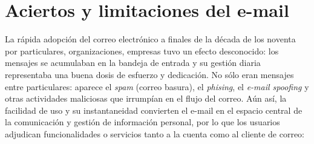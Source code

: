 \documentclass[12pt, a4paper,twoside]{book}
\begin{document}
\section{Aciertos y limitaciones del e-mail}

La rápida adopción del correo electrónico a finales de la década de
los noventa por particulares, organizaciones, empresas tuvo un
efecto desconocido: los mensajes se acumulaban en la bandeja de
entrada y su gestión diaria representaba una buena dosis de
esfuerzo y dedicación. No sólo eran mensajes entre particulares:
aparece el \emph{spam} (correo basura), el \emph{phising}, el
\emph{e-mail spoofing} y otras actividades maliciosas que irrumpían
en el flujo del correo. Aún así, la facilidad de uso y su
instantaneidad convierten el e-mail en el espacio central de la
comunicación y gestión de información personal, por lo que los
usuarios adjudican funcionalidades o servicios tanto a la cuenta
como al cliente de correo:
\end{document}
